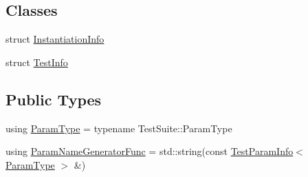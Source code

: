 \subsection*{Classes}
\begin{DoxyCompactItemize}
\item 
struct \hyperlink{structtesting_1_1internal_1_1ParameterizedTestSuiteInfo_1_1InstantiationInfo}{Instantiation\+Info}
\item 
struct \hyperlink{structtesting_1_1internal_1_1ParameterizedTestSuiteInfo_1_1TestInfo}{Test\+Info}
\end{DoxyCompactItemize}
\subsection*{Public Types}
\begin{DoxyCompactItemize}
\item 
using \hyperlink{classtesting_1_1internal_1_1ParameterizedTestSuiteInfo_a10761bd750a6820a8d8d2c654b10fe54}{Param\+Type} = typename Test\+Suite\+::\+Param\+Type
\item 
using \hyperlink{classtesting_1_1internal_1_1ParameterizedTestSuiteInfo_a3b4f232b7d6d3df941bb8e81b6b534a4}{Param\+Name\+Generator\+Func} = std\+::string(const \hyperlink{structtesting_1_1TestParamInfo}{Test\+Param\+Info}$<$ \hyperlink{classtesting_1_1internal_1_1ParameterizedTestSuiteInfo_a10761bd750a6820a8d8d2c654b10fe54}{Param\+Type} $>$ \&)
\end{DoxyCompactItemize}
